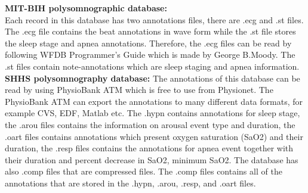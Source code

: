         \textbf{MIT-BIH polysomnographic database: }\\
        Each record in this database has two annotations files, there are .ecg and .st files. The .ecg file contains the beat annotations in wave form while the .st file stores the sleep stage and apnea annotations. Therefore, the .ecg files can be read by following WFDB Programmer's Guide which is made by George B.Moody\cite{MIT_BIH_WFDB}. The .st files contain note-annotations which are sleep staging and apnea information.\\
        \textbf{SHHS polysomnography database: }
        The annotations of this database can be read by using PhysioBank ATM\cite{SHSH_Physiobank} which is free to use from Physionet. The PhysioBank ATM can export the annotations to many different data formats, for example CVS, EDF, Matlab etc. The .hypn contains annotations for sleep stage, the .arou files contains the information on arousal event type and duration, the .oart files contains annotations which present oxygen saturation (SaO2) and their duration, the .resp files contains the annotations for apnea event together with their duration and percent decrease in SaO2, minimum SaO2. The database has also .comp files that are compressed files. The .comp files contains all of the annotations that are stored in the .hypn, .arou, .resp, and .oart files.

